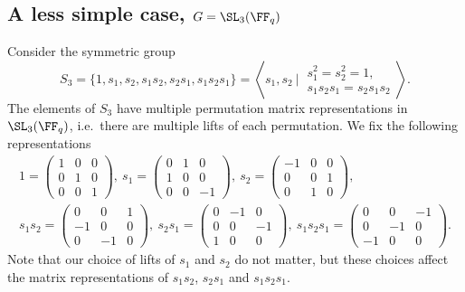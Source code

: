 \documentclass[11pt]{amsart}
\theoremstyle{remark}
\begin{document}

\subsection{A less simple case, $G=\SL_3(\FF_q)$}\label{Section3.3}
Consider the symmetric group
\[
	S_3 = \{1,s_1,s_2,s_1s_2,s_2s_1,s_1s_2s_1\} = \left\langle s_1,s_2\ \Bigg|\ \begin{array}{c} s_1^2=s_2^2=1, \\ s_1s_2s_1=s_2s_1s_2 \end{array}\right\rangle.
\]
The elements of $S_3$ have multiple permutation matrix representations in $\SL_3(\FF_q)$, i.e.\ there are multiple lifts of each permutation.
We fix the following representations
\begin{multline*}
	1 =
	\begin{pmatrix}
		1 & 0 & 0 \\
		0 & 1 & 0 \\
		0 & 0 & 1
	\end{pmatrix}, \
	s_1 =
	\begin{pmatrix}
		0 & 1 & 0  \\
		1 & 0 & 0  \\
		0 & 0 & -1
	\end{pmatrix}, \
	s_2 =
	\begin{pmatrix}
		-1 & 0 & 0 \\
		0  & 0 & 1 \\
		0  & 1 & 0
	\end{pmatrix}, \\
	s_1s_2 =
	\begin{pmatrix}
		0  & 0  & 1 \\
		-1 & 0  & 0 \\
		0  & -1 & 0
	\end{pmatrix}, \ s_2s_1 =
	\begin{pmatrix}
		0 & -1 & 0  \\
		0 & 0  & -1 \\
		1 & 0  & 0
	\end{pmatrix}, \ s_1s_2s_1 =
	\begin{pmatrix}
		0  & 0  & -1 \\
		0  & -1 & 0  \\
		-1 & 0  & 0
	\end{pmatrix}.
\end{multline*}
Note that our choice of lifts of $s_1$ and $s_2$ do not matter, but these choices affect the matrix representations of $s_1s_2$, $s_2s_1$ and $s_1s_2s_1$.
\end{document}

